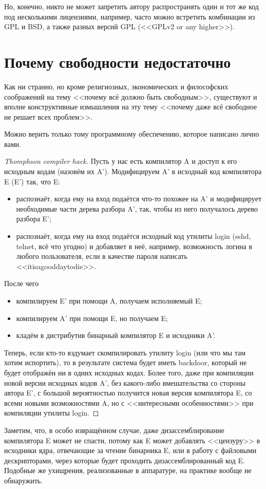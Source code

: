 Но, конечно, никто не может запретить автору распространять один и тот же код под несколькими лицензиями, например, часто можно встретить комбинации из GPL и BSD, а также разных версий GPL (<<GPLv2 or any higher>>).

\section{Почему свободности недостаточно}

Как ни странно, но кроме религиозных, экономических и философских соображений на тему <<почему всё должно быть свободным>>, существуют и вполне конструктивные измышления на эту тему <<почему даже всё свободное не решает всех проблем>>.

\begin{theorem}
Можно верить только тому программному обеспечению, которое написано лично вами.
\end{theorem}

\begin{proof}[Thomphson compiler hack]
Пусть у нас есть компилятор A и доступ к его исходным кодам (назовём их A').
Модифицируем A' в исходный код компилятора E (E') так, что E:
    \begin{itemize}
        \item распознаёт, когда ему на вход подаётся что-то похожее на A' и модифицирует необходимые части дерева разбора A', так, чтобы из него получалось дерево разбора E';
        \item распознаёт, когда ему на вход подаётся исходный код утилиты login (sshd, telnet, всё что угодно) и добавляет в неё, например, возможность логина в любого пользователя, если в качестве пароля написать <<itisagooddaytodie>>.
    \end{itemize}

После чего
    \begin{itemize}
        \item компилируем E' при помощи A, получаем исполняемый E;
        \item компилируем A' при помощи E, но получаем E;
        \item кладём в дистрибутив бинарный компилятор E и исходники A'.
    \end{itemize}

Теперь, если кто-то вздумает скомпилировать утилиту login (или что мы там хотим испортить), то в результате система будет иметь backdoor, который не будет отображён ни в одних исходных кодах. Более того, даже при компиляции новой версии исходных кодов A', без какого-либо вмешательства со стороны автора E', с большой вероятностью получится новая версия компилятора E, со всеми новыми возможностями A, но с <<интересными особенностями>> при компиляции утилиты login.
\end{proof}

Заметим, что, в особо извращённом случае, даже дизассемблирование компилятора E может не спасти, потому как E может добавлять <<цензуру>> в исходники ядра, отвечающие за чтение бинарника E, или в работу с файловыми дескрипторами, через которые будет проходить дизассемблированный код E.
Подобные же ухищрения, реализованные в аппаратуре, на практике вообще не обнаружить.
